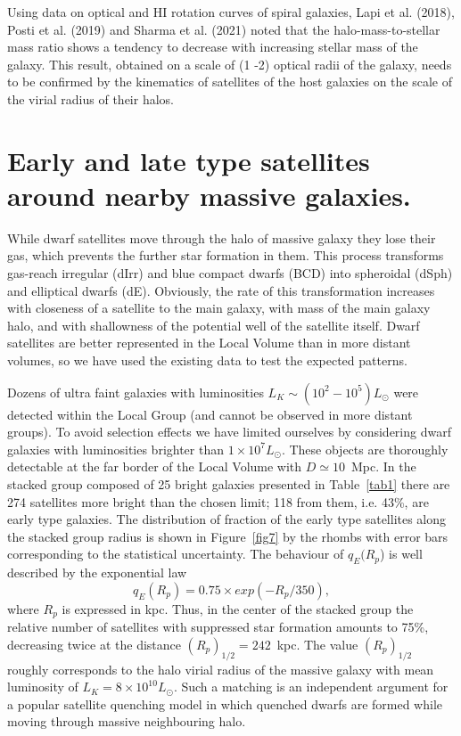 \documentclass[proof]{WileyASNA-v1}
\begin{document}
Using data on optical and HI rotation curves of spiral galaxies, Lapi et al.
(2018), Posti et al. (2019) and Sharma et al. (2021) noted that the
halo-mass-to-stellar mass ratio shows a tendency to decrease with increasing
stellar mass of the galaxy. This result, obtained on a scale of (1 -2) optical
radii of the galaxy, needs to be confirmed by the kinematics of satellites of
the host galaxies on the scale of the virial radius of their halos.

\section{Early and late type satellites around nearby massive galaxies.}\label{sec5}

While dwarf satellites move through the halo of massive galaxy they lose their
gas, which prevents the further star formation in them. This process transforms
gas-reach irregular (dIrr) and blue compact dwarfs (BCD) into spheroidal (dSph)
and elliptical dwarfs (dE). Obviously, the rate of this transformation increases
with closeness of a satellite to the main galaxy, with mass of the main galaxy
halo, and with shallowness of the potential well of the satellite itself. Dwarf
satellites are better represented in the Local Volume than in more distant
volumes, so we have used the existing data to test the expected patterns.

Dozens of ultra faint galaxies with luminosities $L_K\sim(10^2-10^5)L_{\odot}$
were detected within the Local Group (and cannot be observed in more distant
groups). To avoid selection effects we have limited ourselves by considering
dwarf galaxies with luminosities brighter than $1\times10^7L_{\odot}$. These
objects are thoroughly detectable at the far border of the Local Volume with
$D\simeq10$~Mpc. In the stacked group composed of 25 bright galaxies presented
in Table~\ref{tab1} there are 274 satellites more bright than the chosen limit;
118 from them, i.e. 43\%, are early type galaxies. The distribution of fraction
of the early type satellites along the stacked group radius is shown in
Figure~\ref{fig7} by the rhombs with error bars corresponding to the statistical
uncertainty. The behaviour of $q_E(R_p$) is well described by the exponential
law 
\begin{equation}
q_E(R_p)=0.75\times exp(-R_p/350),
\end{equation}
where $R_p$ is expressed in kpc. Thus, in the center of the stacked group the
relative number of satellites with suppressed star formation amounts to 75\%,
decreasing twice at the distance $(R_p)_{1/2}=242$~kpc. The value $(R_p)_{1/2}$
roughly corresponds to the halo virial radius of the massive galaxy with mean
luminosity of $L_K=8\times10^{10}L_{\odot}$. Such a matching is an independent
argument for a popular satellite quenching model in which quenched dwarfs are
formed while moving through massive neighbouring halo.
\end{document}
